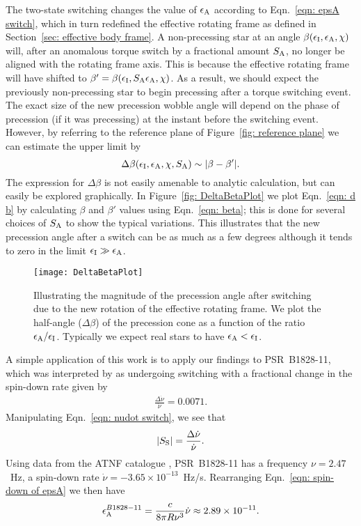 \documentclass[../full_thesis/full_thesis.tex]{subfiles}
\begin{document}
The two-state switching changes the value of $\epsilon_{\mathrm{A}}$ according to
Eqn.~\eqref{eqn: epsA switch}, which in turn redefined the effective rotating frame
as defined in Section~\ref{sec: effective body frame}. A non-precessing star at an
angle $\beta(\epsilon_{\mathrm{I}}, \epsilon_{\mathrm{A}}, \chi)$ will, after an anomalous torque switch by a fractional
amount $S_{\mathrm{A}}$, no longer be aligned with the rotating frame axis. This is
because the effective rotating frame will have shifted to $\beta' = \beta(\epsilon_{\mathrm{I}},
S_{\mathrm{A}}\epsilon_{\mathrm{A}}, \chi)$. As a result, we should expect the previously
non-precessing star to begin precessing after a torque switching event.
The exact size of the new precession wobble angle will depend on the phase of
precession (if it was precessing) at the instant before the switching event.
However, by referring to the reference plane of Figure~\ref{fig: reference plane}
we can estimate the upper limit by
\begin{equation}
    \Delta\beta(\epsilon_{\mathrm{I}}, \epsilon_{\mathrm{A}}, \chi, S_{\mathrm{A}}) \sim |\beta - \beta'|.
\label{eqn: d b}
\end{equation}
The expression for $\Delta \beta$ is not easily amenable to analytic
calculation, but can easily be explored graphically. In Figure~\ref{fig:
DeltaBetaPlot} we plot Eqn.~\eqref{eqn: d b} by calculating $\beta$ and
$\beta'$ values using Eqn.~\eqref{eqn: beta}; this is done for several choices
of $S_{\mathrm{A}}$ to show the typical variations. This illustrates that the new
precession angle after a switch can be as much as a few degrees although it
tends to zero in the limit $\epsilon_{\mathrm{I}} \gg \epsilon_{\mathrm{A}}$.
\begin{figure}[htb]
    \centering
    \texttt{[image: DeltaBetaPlot]}
    \caption{Illustrating the magnitude of the precession angle after switching
        due to the new rotation of the effective rotating frame. We plot the half-angle
        ($\Delta\beta$) of the precession cone as a function of the ratio
    $\epsilon_{\mathrm{A}}/\epsilon_{\mathrm{I}}$. Typically we expect real stars to have $\epsilon_{\mathrm{A}} < \epsilon_{\mathrm{I}}$.}
    \label{fig: DeltaBetaPlot}
\end{figure}

A simple application of this work is to apply our findings to PSR~B1828-11,
which was interpreted by \citet{Lyne2010} as undergoing switching with a fractional
change in the spin-down rate given by
\begin{align}
\frac{\Delta\dot{\nu}}{\dot{\nu}} = 0.0071.
\end{align}
Manipulating Eqn.~\eqref{eqn: nudot switch}, we see that
\begin{align}
|S_{\mathrm{S}}| = \frac{\Delta\dot{\nu}}{\dot{\nu}}.
\end{align}
Using data from the ATNF catalogue \citep{ATNF}, PSR~B1828-11 has a frequency
$\nu = 2.47$~Hz, a spin-down rate $\dot{\nu}=-3.65\times10^{-13}$~Hz/s.
Rearranging Eqn.~\ref{eqn: spin-down of epsA} we then have
\begin{align}
\epsilon_{\mathrm{A}}^{B1828-11} = \frac{c}{8\pi R\nu^{3}}\dot{\nu} \approx 2.89 \times 10^{-11}.
\end{align}
\end{document}
